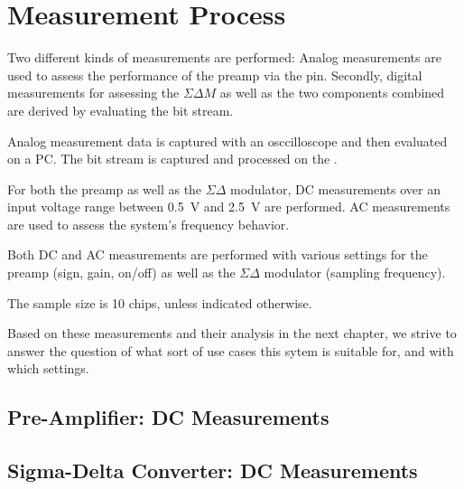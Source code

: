 \chapter{Measurement Process}
\label{chap:measurementProcess}


Two different  kinds of measurements  are performed:  Analog  measurements are
used  to assess  the  performance  of the  preamp  via  the 
pin. Secondly, digital measurements for assessing the $\Sigma\Delta M$ as well
as the two components combined are derived by evaluating the bit stream.

Analog measurement data  is captured with an osccilloscope  and then evaluated
on a PC. The bit stream is captured and processed on the \raspi.

For both the  preamp as well as the $\Sigma\Delta$  modulator, DC measurements
over an input  voltage range between \SI{0.5}{\volt}  and  \SI{2.5}{\volt} are
performed. AC measurements are used to assess the system's frequency behavior.

Both DC and AC measurements are performed with various settings for the preamp
(sign,  gain,  on/off)  as  well as  the  $\Sigma\Delta$  modulator  (sampling
frequency).

The sample size is 10 chips, unless indicated otherwise.

Based on these measurements and their  analysis in the next chapter, we strive
to answer the question  of what sort of use cases this  sytem is suitable for,
and with which settings.



\section{Pre-Amplifier: DC Measurements}
\label{sec:preAmpDC}

\section{Sigma-Delta Converter: DC Measurements}
\label{sec:sigdelDC}

